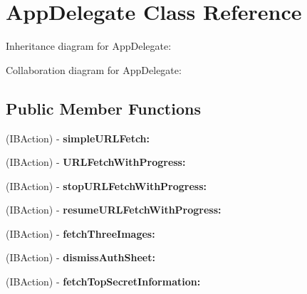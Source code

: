 \hypertarget{interface_app_delegate}{
\section{\-App\-Delegate \-Class \-Reference}
\label{interface_app_delegate}
}


\-Inheritance diagram for \-App\-Delegate\-:


\-Collaboration diagram for \-App\-Delegate\-:
\subsection*{\-Public \-Member \-Functions}
\begin{DoxyCompactItemize}
\item 
\hypertarget{interface_app_delegate_aed8bd6c24d0a5ea30b1c339eaae5386f}{
(\-I\-B\-Action) -\/ {\bfseries simple\-U\-R\-L\-Fetch\-:}}
\label{interface_app_delegate_aed8bd6c24d0a5ea30b1c339eaae5386f}

\item 
\hypertarget{interface_app_delegate_a31be6a08dc6a3f484bc48210daf92f4a}{
(\-I\-B\-Action) -\/ {\bfseries \-U\-R\-L\-Fetch\-With\-Progress\-:}}
\label{interface_app_delegate_a31be6a08dc6a3f484bc48210daf92f4a}

\item 
\hypertarget{interface_app_delegate_a65dab657243398839f2c784bf000089c}{
(\-I\-B\-Action) -\/ {\bfseries stop\-U\-R\-L\-Fetch\-With\-Progress\-:}}
\label{interface_app_delegate_a65dab657243398839f2c784bf000089c}

\item 
\hypertarget{interface_app_delegate_a2cade9ac0202476ed05e61f80bf264d7}{
(\-I\-B\-Action) -\/ {\bfseries resume\-U\-R\-L\-Fetch\-With\-Progress\-:}}
\label{interface_app_delegate_a2cade9ac0202476ed05e61f80bf264d7}

\item 
\hypertarget{interface_app_delegate_ac4539e36ee04667d57b2c8e04d86ab2b}{
(\-I\-B\-Action) -\/ {\bfseries fetch\-Three\-Images\-:}}
\label{interface_app_delegate_ac4539e36ee04667d57b2c8e04d86ab2b}

\item 
\hypertarget{interface_app_delegate_a58df587c5185342c391c88891df13914}{
(\-I\-B\-Action) -\/ {\bfseries dismiss\-Auth\-Sheet\-:}}
\label{interface_app_delegate_a58df587c5185342c391c88891df13914}

\item 
\hypertarget{interface_app_delegate_ac5d049cda6ea4cca2ea549a7401bda67}{
(\-I\-B\-Action) -\/ {\bfseries fetch\-Top\-Secret\-Information\-:}}
\label{interface_app_delegate_ac5d049cda6ea4cca2ea549a7401bda67}


\end{DoxyCompactItemize}
